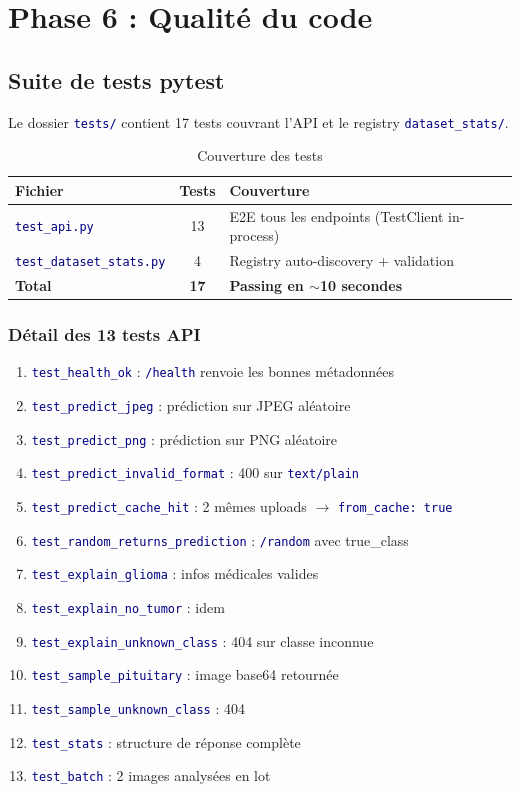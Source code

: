 \documentclass[11pt,a4paper,oneside]{report}
\newcommand{\code}[1]{\texttt{\textcolor{navy}{#1}}}
\begin{document}
\chapter{Phase 6 : Qualité du code}

\section{Suite de tests pytest}

Le dossier \code{tests/} contient 17 tests couvrant l'API et le registry \code{dataset\_stats/}.

\begin{table}[!htbp]
\centering
\caption{Couverture des tests}
\begin{tabular}{|l|c|l|}
\hline
\textbf{Fichier} & \textbf{Tests} & \textbf{Couverture} \\
\hline
\code{test\_api.py} & 13 & E2E tous les endpoints (TestClient in-process) \\
\hline
\code{test\_dataset\_stats.py} & 4 & Registry auto-discovery + validation \\
\hline
\textbf{Total} & \textbf{17} & \textbf{Passing en $\sim$10 secondes} \\
\hline
\end{tabular}
\end{table}

\subsection{Détail des 13 tests API}

\begin{enumerate}
\item \code{test\_health\_ok} : \code{/health} renvoie les bonnes métadonnées
\item \code{test\_predict\_jpeg} : prédiction sur JPEG aléatoire
\item \code{test\_predict\_png} : prédiction sur PNG aléatoire
\item \code{test\_predict\_invalid\_format} : 400 sur \code{text/plain}
\item \code{test\_predict\_cache\_hit} : 2 mêmes uploads $\to$ \code{from\_cache: true}
\item \code{test\_random\_returns\_prediction} : \code{/random} avec true\_class
\item \code{test\_explain\_glioma} : infos médicales valides
\item \code{test\_explain\_no\_tumor} : idem
\item \code{test\_explain\_unknown\_class} : 404 sur classe inconnue
\item \code{test\_sample\_pituitary} : image base64 retournée
\item \code{test\_sample\_unknown\_class} : 404
\item \code{test\_stats} : structure de réponse complète
\item \code{test\_batch} : 2 images analysées en lot
\end{enumerate}
\end{document}
